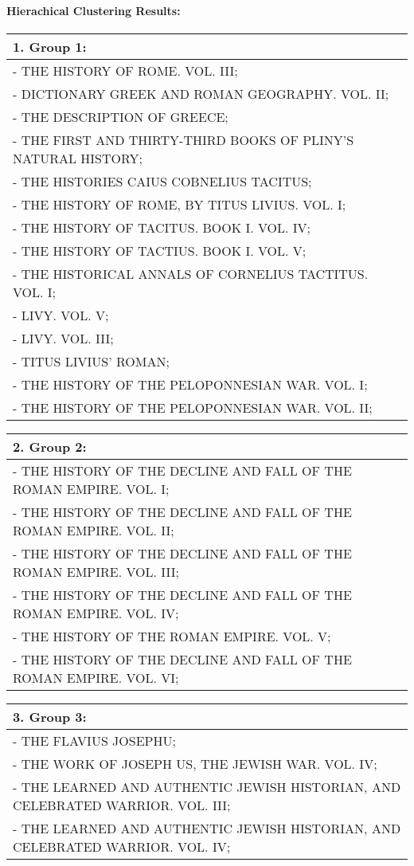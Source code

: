 \documentclass[11pt]{article}
\begin{document}
    \hypertarget{hierachical-clustering-results}{%
\paragraph{Hierachical Clustering
Results:}\label{hierachical-clustering-results}}

\begin{longtable}[]{@{}l@{}}
\toprule
1. Group 1:\tabularnewline
\midrule
\endhead
- THE HISTORY OF ROME. VOL. III;\tabularnewline
- DICTIONARY GREEK AND ROMAN GEOGRAPHY. VOL. II;\tabularnewline
- THE DESCRIPTION OF GREECE;\tabularnewline
- THE FIRST AND THIRTY-THIRD BOOKS OF PLINY'S NATURAL
HISTORY;\tabularnewline
- THE HISTORIES CAIUS COBNELIUS TACITUS;\tabularnewline
- THE HISTORY OF ROME, BY TITUS LIVIUS. VOL. I;\tabularnewline
- THE HISTORY OF TACITUS. BOOK I. VOL. IV;\tabularnewline
- THE HISTORY OF TACTIUS. BOOK I. VOL. V;\tabularnewline
- THE HISTORICAL ANNALS OF CORNELIUS TACTITUS. VOL. I;\tabularnewline
- LIVY. VOL. V;\tabularnewline
- LIVY. VOL. III;\tabularnewline
- TITUS LIVIUS' ROMAN;\tabularnewline
- THE HISTORY OF THE PELOPONNESIAN WAR. VOL. I;\tabularnewline
- THE HISTORY OF THE PELOPONNESIAN WAR. VOL. II;\tabularnewline
\bottomrule
\end{longtable}

\begin{longtable}[]{@{}l@{}}
\toprule
2. Group 2:\tabularnewline
\midrule
\endhead
- THE HISTORY OF THE DECLINE AND FALL OF THE ROMAN EMPIRE. VOL.
I;\tabularnewline
- THE HISTORY OF THE DECLINE AND FALL OF THE ROMAN EMPIRE. VOL.
II;\tabularnewline
- THE HISTORY OF THE DECLINE AND FALL OF THE ROMAN EMPIRE. VOL.
III;\tabularnewline
- THE HISTORY OF THE DECLINE AND FALL OF THE ROMAN EMPIRE. VOL.
IV;\tabularnewline
- THE HISTORY OF THE ROMAN EMPIRE. VOL. V;\tabularnewline
- THE HISTORY OF THE DECLINE AND FALL OF THE ROMAN EMPIRE. VOL.
VI;\tabularnewline
\bottomrule
\end{longtable}

\begin{longtable}[]{@{}l@{}}
\toprule
\begin{minipage}[b]{0.97\columnwidth}\raggedright
3. Group 3:\strut
\end{minipage}\tabularnewline
\midrule
\endhead
\begin{minipage}[t]{0.97\columnwidth}\raggedright
- THE FLAVIUS JOSEPHU;\strut
\end{minipage}\tabularnewline
\begin{minipage}[t]{0.97\columnwidth}\raggedright
- THE WORK OF JOSEPH US, THE JEWISH WAR. VOL. IV;\strut
\end{minipage}\tabularnewline
\begin{minipage}[t]{0.97\columnwidth}\raggedright
- THE LEARNED AND AUTHENTIC JEWISH HISTORIAN, AND CELEBRATED WARRIOR.
VOL. III;\strut
\end{minipage}\tabularnewline
\begin{minipage}[t]{0.97\columnwidth}\raggedright
- THE LEARNED AND AUTHENTIC JEWISH HISTORIAN, AND CELEBRATED WARRIOR.
VOL. IV;\strut
\end{minipage}\tabularnewline
\bottomrule
\end{longtable}
\end{document}

